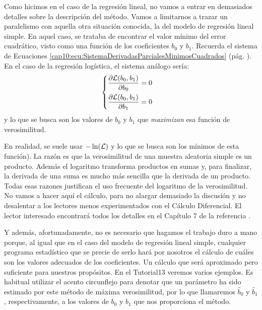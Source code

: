 Como hicimos en el caso de la regresión lineal, no vamos a entrar en demasiados detalles sobre la descripción del método. Vamos a limitarnos a trazar un paralelismo con aquella otra situación conocida, la del modelo de regresión lineal simple. En aquel caso, se trataba de encontrar el valor mínimo del error cuadrático, visto como una función de los coeficientes $b_0$ y $b_1$. Recuerda el sistema de Ecuaciones \ref{cap10:ecu:SistemaDerivadasParcialesMinimosCuadrados} (pág. \pageref{cap10:ecu:SistemaDerivadasParcialesMinimosCuadrados}). En el caso de la regresión logística, el sistema análogo sería:
\begin{equation}
\label{cap10:ecu:SistemaDerivadasParcialesMaximaVerosimilitud}
\begin{cases}
\dfrac{\partial {\cal L}(b_0,b_1)}{\partial b_0}=0\\[3mm]
\dfrac{\partial {\cal L}(b_0,b_1)}{\partial b_1}=0
\end{cases}
\end{equation}
y lo que se busca son los valores de $b_0$ y $b_1$ que {\em maximizan} esa función de verosimilitud.

En realidad, se suele usar $-\ln({\cal L})$ y lo que se busca son los mínimos de esta función). La razón es que la verosimilitud de una muestra aleatoria simple es un producto. Además el logaritmo transforma productos en sumas y, para finalizar, la derivada de una suma es mucho más sencilla que la derivada de un producto. Todas esas razones justifican el uso frecuente del logaritmo de la verosimilitud. No vamos a hacer aquí el cálculo, para no alargar demasiado la discusión y no desalentar a los lectores menos experimentados con el Cálculo Diferencial.  El lector interesado encontrará todos los detalles en el Capítulo 7 de la referencia \cite{dobson2011introduction}.



Y además, afortunadamente, no es necesario que hagamos el trabajo duro a mano porque, al igual que en el caso del modelo de regresión lineal simple, cualquier programa estadístico que se precie de serlo hará por nosotros el cálculo de cuáles son los valores adecuados de los coeficientes. Un cálculo que será aproximado pero suficiente para nuestros propósitos.  En el  Tutorial13 veremos varios ejemplos. Es habitual utilizar el acento circunflejo para denotar que un parámetro ha sido estimado por este método de máxima verosimilitud, por lo que llamaremos $\hat{b}_0$ y $\hat{b}_1$, respectivamente, a los valores de $b_0$ y $b_1$ que nos proporciona el método.

